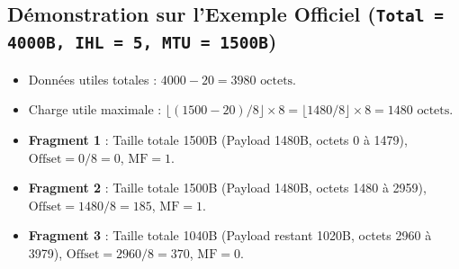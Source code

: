 \documentclass[11pt,a4paper]{report}
\begin{document}
\subsection{D\'emonstration sur l'Exemple Officiel (\texttt{Total = 4000B, IHL = 5, MTU = 1500B})}
\begin{itemize}
    \item Donn\'ees utiles totales : $4000 - 20 = 3980\text{ octets}$.
    \item Charge utile maximale : $\lfloor (1500 - 20) / 8 \rfloor \times 8 = \lfloor 1480 / 8 \rfloor \times 8 = 1480\text{ octets}$.
    \item \textbf{Fragment 1} : Taille totale 1500B (Payload 1480B, octets 0 \`a 1479), $\text{Offset} = 0 / 8 = 0$, $\text{MF} = 1$.
    \item \textbf{Fragment 2} : Taille totale 1500B (Payload 1480B, octets 1480 \`a 2959), $\text{Offset} = 1480 / 8 = 185$, $\text{MF} = 1$.
    \item \textbf{Fragment 3} : Taille totale 1040B (Payload restant 1020B, octets 2960 \`a 3979), $\text{Offset} = 2960 / 8 = 370$, $\text{MF} = 0$.
\end{itemize}
\end{document}
